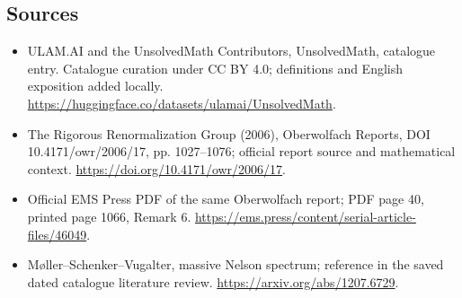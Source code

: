 \documentclass[11pt]{article}
\begin{document}
\subsection{Sources}
\begin{itemize}
\item[\hypertarget{source:statement:1}{S1}] ULAM.AI and the UnsolvedMath Contributors, UnsolvedMath, catalogue entry. Catalogue curation under CC BY 4.0; definitions and English exposition added locally.
\url{https://huggingface.co/datasets/ulamai/UnsolvedMath}.
\item[\hypertarget{source:statement:2}{S2}] The Rigorous Renormalization Group (2006), Oberwolfach Reports, DOI 10.4171/owr/2006/17, pp. 1027--1076; official report source and mathematical context.
\url{https://doi.org/10.4171/owr/2006/17}.
\item[\hypertarget{source:statement:3}{S3}] Official EMS Press PDF of the same Oberwolfach report; PDF page 40, printed page 1066, Remark 6.
\url{https://ems.press/content/serial-article-files/46049}.
\item[\hypertarget{source:statement:4}{S4}] Møller--Schenker--Vugalter, massive Nelson spectrum; reference in the saved dated catalogue literature review.
\url{https://arxiv.org/abs/1207.6729}.
\end{itemize}
\label{end:statement}
\end{document}
